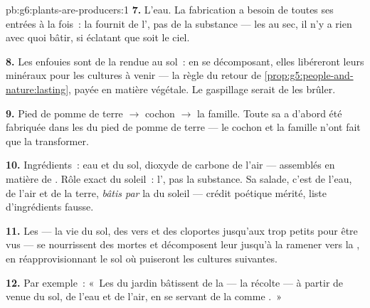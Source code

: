 \begin{solution}{pb:g6:plants-are-producers:1}
\textbf{7.} L'eau. La fabrication a besoin de toutes ses entrées à
la fois~: la  fournit de l', pas de la substance ---
les  au sec, il n'y a rien avec quoi bâtir, si éclatant que
soit le ciel.

\textbf{8.} Les  enfouies sont de la  rendue
au sol~: en se décomposant, elles libéreront leurs minéraux pour les
cultures à venir --- la règle du retour de
\cref{prop:g5:people-and-nature:lasting}, payée en matière végétale.
Le gaspillage serait de les brûler.

\textbf{9.} Pied de pomme de terre $\rightarrow$ cochon
$\rightarrow$ la famille. Toute sa  a d'abord été
fabriquée dans les  du pied de pomme de terre --- le cochon
et la famille n'ont fait que la transformer.

\textbf{10.} Ingrédients~: eau et  du sol, dioxyde de
carbone de l'air --- assemblés en matière de . Rôle exact du
soleil~: l', pas la substance. Sa salade, c'est de l'eau, de
l'air et de la terre, \emph{bâtis par} la  du soleil ---
crédit poétique mérité, liste d'ingrédients fausse.

\textbf{11.} Les  --- la vie du sol, des vers et des
cloportes jusqu'aux  trop petits pour être vus --- se
nourrissent des  mortes et décomposent leur  jusqu'à la ramener vers la , en
réapprovisionnant le sol où puiseront les cultures suivantes.

\textbf{12.} Par exemple~: «~Les  du jardin bâtissent de
la  --- la récolte --- à partir de 
venue du sol, de l'eau et de l'air, en se servant de la 
comme .~»
\end{solution}

